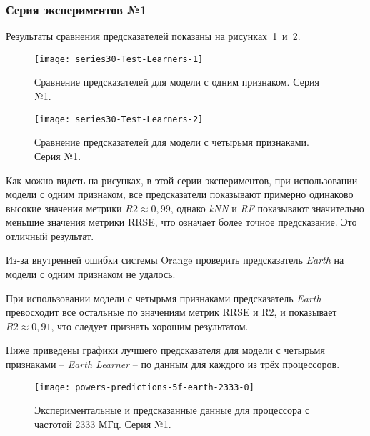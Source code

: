 \subsubsection{Серия экспериментов №1}

Результаты сравнения предсказателей показаны на рисунках~\ref{img:series30-Test-Learners-1}~и~\ref{img:series30-Test-Learners-2}.

\begin{figure}[H]
    \begin{center}
            \texttt{[image: series30-Test-Learners-1]}
            \caption{Сравнение предсказателей для модели с одним признаком. Серия №1.} %
            \label{img:series30-Test-Learners-1} %
    \end{center}
\end{figure}

\begin{figure}[H]
    \begin{center}
            \texttt{[image: series30-Test-Learners-2]}
            \caption{Сравнение предсказателей для модели с четырьмя признаками. Серия №1.}
            \label{img:series30-Test-Learners-2}
    \end{center}
\end{figure}

Как можно видеть на рисунках, в этой серии экспериментов, при использовании модели с одним признаком, все предсказатели показывают примерно одинаково высокие значения метрики $R2 \approx 0,99$, однако \textit{kNN} и \textit{RF} показывают значительно меньшие значения метрики RRSE, что означает более точное предсказание. Это отличный результат.

Из-за внутренней ошибки системы Orange проверить предсказатель \textit{Earth} на модели с одним признаком не удалось.

При использовании модели с четырьмя признаками предсказатель \textit{Earth} превосходит все остальные по значениям метрик RRSE и R2, и показывает $R2 \approx 0,91$, что следует признать хорошим результатом.

Ниже приведены графики лучшего предсказателя для модели с четырьмя признаками -- \textit{Earth Learner} -- по данным для каждого из трёх процессоров.

\begin{figure}[H]
    \begin{center}
        \texttt{[image: powers-predictions-5f-earth-2333-0]}
        \caption{Экспериментальные и предсказанные данные для процессора с частотой 2333 МГц. Серия №1.}
        \label{img:powers-predictions-5f-earth-2333-0}
    \end{center}
\end{figure}

